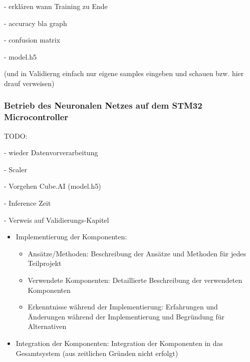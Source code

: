 - erklären wann Training zu Ende

- accuracy bla graph

- confusion matrix

- model.h5

(und in Validierng einfach nur eigene samples eingeben und schauen bzw. hier drauf verweisen)




\subsubsection{Betrieb des Neuronalen Netzes auf dem STM32 Microcontroller}
TODO:

- wieder Datenvorverarbeitung

- Scaler

- Vorgehen Cube.AI (model.h5)

- Inference Zeit

- Verweis auf Validierungs-Kapitel


\begin{itemize}
    \item Implementierung der Komponenten:
    \begin{itemize}
        \item Ansätze/Methoden: Beschreibung der Ansätze und Methoden für jedes Teilprojekt
        \item Verwendete Komponenten: Detaillierte Beschreibung der verwendeten Komponenten
        \item Erkenntnisse während der Implementierung: Erfahrungen und Änderungen während der Implementierung und Begründung für Alternativen
    \end{itemize}
    \item Integration der Komponenten: Integration der Komponenten in das Gesamtsystem (aus zeitlichen Gründen nicht erfolgt)
\end{itemize}